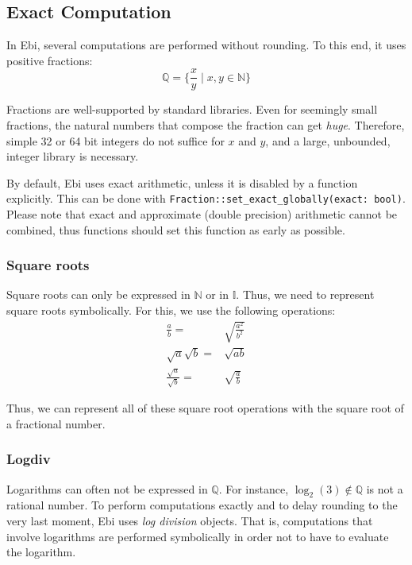 \documentclass{article}
\begin{document}
    \subsection{Exact Computation}
    \label{sec:exact}
        In Ebi, several computations are performed without rounding.
        To this end, it uses positive fractions: 
        $$\mathbb{Q} = \{ \frac{x}{y} \mid x, y \in \mathbb{N} \}$$
    
        Fractions are well-supported by standard libraries.
        Even for seemingly small fractions, the natural numbers that compose the fraction can get \emph{huge}.
        Therefore, simple 32 or 64 bit integers do not suffice for $x$ and $y$, and a large, unbounded, integer library is necessary.
    
        By default, Ebi uses exact arithmetic, unless it is disabled by a function explicitly.
        This can be done with \verb=Fraction::set_exact_globally(exact: bool)=.
        Please note that exact and approximate (double precision) arithmetic cannot be combined, thus functions should set this function as early as possible.

        \subsubsection{Square roots}
            Square roots can only be expressed in $\mathbb{N}$ or in $\mathbb{I}$.
            Thus, we need to represent square roots symbolically.
            For this, we use the following operations:
            \begin{align*}
                \frac{a}{b} ={}& \sqrt{\frac{a^2}{b^2}}\\
                \sqrt{a} \sqrt{b} ={}& \sqrt{a b}\\
                \frac{\sqrt{a}}{\sqrt{b}} ={}& \sqrt{\frac{a}{b}}
            \end{align*}
    
            Thus, we can represent all of these square root operations with the square root of a fractional number.

        \subsubsection{Logdiv}
            Logarithms can often not be expressed in $\mathbb{Q}$.
            For instance, $\log_2(3) \notin \mathbb{Q}$ is not a rational number.
            To perform computations exactly and to delay rounding to the very last moment, Ebi uses \emph{log division} objects.
            That is, computations that involve logarithms are performed symbolically in order not to have to evaluate the logarithm.
            
\end{document}
